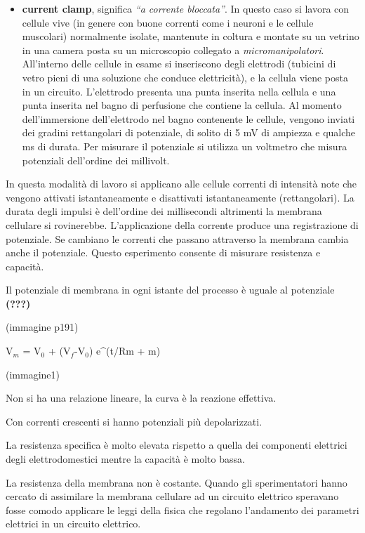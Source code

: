 \documentclass[]{article}
\begin{document}
\begin{itemize}
\itemsep1pt\parskip0pt
\item
  \textbf{current clamp}, significa \emph{``a corrente bloccata''}. In
  questo caso si lavora con cellule vive (in genere con buone correnti
  come i neuroni e le cellule muscolari) normalmente isolate, mantenute
  in coltura e montate su un vetrino in una camera posta su un
  microscopio collegato a \emph{micromanipolatori}. All'interno delle
  cellule in esame si inseriscono degli elettrodi (tubicini di vetro
  pieni di una soluzione che conduce elettricità), e la cellula viene
  posta in un circuito. L'elettrodo presenta una punta inserita nella
  cellula e una punta inserita nel bagno di perfusione che contiene la
  cellula. Al momento dell'immersione dell'elettrodo nel bagno
  contenente le cellule, vengono inviati dei gradini rettangolari di
  potenziale, di solito di 5 mV di ampiezza e qualche ms di durata. Per
  misurare il potenziale si utilizza un voltmetro che misura potenziali
  dell'ordine dei millivolt.
\end{itemize}

In questa modalità di lavoro si applicano alle cellule correnti di
intensità note che vengono attivati istantaneamente e disattivati
istantaneamente (rettangolari). La durata degli impulsi è dell'ordine
dei millisecondi altrimenti la membrana cellulare si rovinerebbe.
L'applicazione della corrente produce una registrazione di potenziale.
Se cambiano le correnti che passano attraverso la membrana cambia anche
il potenziale. Questo esperimento consente di misurare resistenza e
capacità.

Il potenziale di membrana in ogni istante del processo è uguale al
potenziale \textbf{(???)}

(immagine p191)

V\(_m\) = V\(_0\) + (V\(_f\)-V\(_0\)) e\^{}(t/Rm + m)

(immagine1)

Non si ha una relazione lineare, la curva è la reazione effettiva.

Con correnti crescenti si hanno potenziali più depolarizzati.

La resistenza specifica è molto elevata rispetto a quella dei componenti
elettrici degli elettrodomestici mentre la capacità è molto bassa.

La resistenza della membrana non è costante. Quando gli sperimentatori
hanno cercato di assimilare la membrana cellulare ad un circuito
elettrico speravano fosse comodo applicare le leggi della fisica che
regolano l'andamento dei parametri elettrici in un circuito elettrico.
\end{document}

